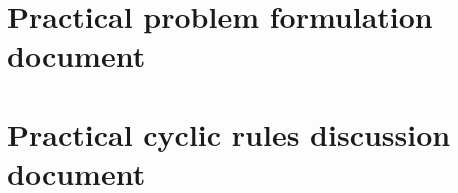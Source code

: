 \documentclass[oneside,a4paper,11pt]{kth-mag}
\begin{document}
\section{Practical problem formulation document}\label{sec:problem-formulation}


\section{Practical cyclic rules discussion document}\label{sec:cyclic-rules}

\end{document}

